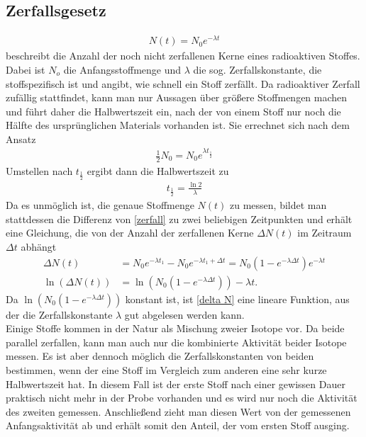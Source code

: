 	\subsection{Zerfallsgesetz}
	\label{zerfallsgesetz}
\begin{align}
	N(t)=N_0e^{-\lambda t}
	\label{zerfall}
\end{align}
beschreibt die Anzahl der noch nicht zerfallenen Kerne eines radioaktiven Stoffes. Dabei ist $N_o$ die Anfangsstoffmenge und $\lambda$ die sog. Zerfallskonstante, die stoffspezifisch ist und angibt, wie schnell ein Stoff zerfällt. Da radioaktiver Zerfall zufällig stattfindet, kann man nur Aussagen über größere Stoffmengen machen und führt daher die Halbwertszeit ein, nach der von einem Stoff nur noch die Hälfte des ursprünglichen Materials vorhanden ist. Sie errechnet sich nach dem Ansatz
\begin{align}
	\frac{1}{2}N_0=N_0e^{\lambda t_{\frac{1}{2}}}
\end{align}
Umstellen nach $t_{\frac{1}{2}}$ ergibt dann die Halbwertszeit zu
\begin{align}
	t_{\frac{1}{2}}=\frac{\ln 2}{\lambda}
	\label{halbwertszeit}
\end{align}
Da es unmöglich ist, die genaue Stoffmenge $N(t)$ zu messen, bildet man stattdessen die Differenz von \ref{zerfall} zu zwei beliebigen Zeitpunkten und erhält eine Gleichung, die von der Anzahl der zerfallenen Kerne $\Delta N(t)$ im Zeitraum $\Delta t$ abhängt
\begin{align}
	\Delta N(t) &= N_0 e^{-\lambda t_1}-N_0 e^{-\lambda t_1+\Delta t} = N_0 (1-e^{-\lambda \Delta t}) e^{-\lambda t}\\
	\ln (\Delta N(t)) &= \ln (N_0 (1-e^{-\lambda \Delta t})) -\lambda t.
	\label{delta N}
\end{align}
Da $\ln (N_0 (1-e^{-\lambda \Delta t}))$ konstant ist, ist \ref{delta N} eine lineare Funktion, aus der die Zerfallskonstante $\lambda$ gut abgelesen werden kann.\\
Einige Stoffe kommen in der Natur als Mischung zweier Isotope vor. Da beide parallel zerfallen, kann man auch nur die kombinierte Aktivität beider Isotope messen.
Es ist aber dennoch möglich die Zerfallskonstanten von beiden bestimmen, wenn der eine Stoff im Vergleich zum anderen eine sehr kurze Halbwertszeit hat. In diesem Fall ist der erste Stoff nach einer gewissen Dauer praktisch nicht mehr in der Probe vorhanden und es wird nur noch die Aktivität des zweiten gemessen.
Anschließend zieht man diesen Wert von der gemessenen Anfangsaktivität ab und erhält somit den Anteil, der vom ersten Stoff ausging.

